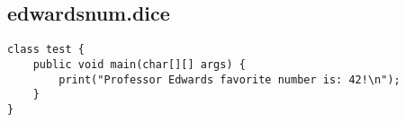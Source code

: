 \subsection{edwardsnum.dice}
\begin{verbatim}
class test {
	public void main(char[][] args) {
		print("Professor Edwards favorite number is: 42!\n");
	}
}
\end{verbatim}